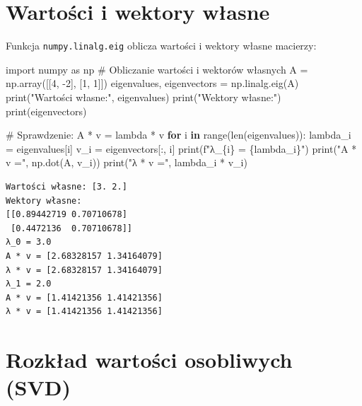 \documentclass[
  polish,
  letterpaper,
  DIV=11,
  numbers=noendperiod]{scrreprt}
\newenvironment{Shaded}{\begin{snugshade}}{\end{snugshade}}
\newcommand{\BuiltInTok}[1]{\textcolor[rgb]{0.00,0.23,0.31}{#1}}
\newcommand{\CommentTok}[1]{\textcolor[rgb]{0.37,0.37,0.37}{#1}}
\newcommand{\ControlFlowTok}[1]{\textcolor[rgb]{0.00,0.23,0.31}{\textbf{#1}}}
\newcommand{\DecValTok}[1]{\textcolor[rgb]{0.68,0.00,0.00}{#1}}
\newcommand{\ImportTok}[1]{\textcolor[rgb]{0.00,0.46,0.62}{#1}}
\newcommand{\KeywordTok}[1]{\textcolor[rgb]{0.00,0.23,0.31}{\textbf{#1}}}
\newcommand{\NormalTok}[1]{\textcolor[rgb]{0.00,0.23,0.31}{#1}}
\newcommand{\OperatorTok}[1]{\textcolor[rgb]{0.37,0.37,0.37}{#1}}
\newcommand{\SpecialCharTok}[1]{\textcolor[rgb]{0.37,0.37,0.37}{#1}}
\newcommand{\SpecialStringTok}[1]{\textcolor[rgb]{0.13,0.47,0.30}{#1}}
\newcommand{\StringTok}[1]{\textcolor[rgb]{0.13,0.47,0.30}{#1}}
\begin{document}
\section{Wartości i wektory
własne}\label{wartoux15bci-i-wektory-wux142asne}

Funkcja \texttt{numpy.linalg.eig} oblicza wartości i wektory własne
macierzy:

\begin{Shaded}
\begin{Highlighting}[]
\ImportTok{import}\NormalTok{ numpy }\ImportTok{as}\NormalTok{ np}
\CommentTok{\# Obliczanie wartości i wektorów własnych}
\NormalTok{A }\OperatorTok{=}\NormalTok{ np.array([[}\DecValTok{4}\NormalTok{, }\OperatorTok{{-}}\DecValTok{2}\NormalTok{], [}\DecValTok{1}\NormalTok{, }\DecValTok{1}\NormalTok{]])}
\NormalTok{eigenvalues, eigenvectors }\OperatorTok{=}\NormalTok{ np.linalg.eig(A)}
\BuiltInTok{print}\NormalTok{(}\StringTok{"Wartości własne:"}\NormalTok{, eigenvalues)}
\BuiltInTok{print}\NormalTok{(}\StringTok{"Wektory własne:"}\NormalTok{)}
\BuiltInTok{print}\NormalTok{(eigenvectors)}

\CommentTok{\# Sprawdzenie: A * v = lambda * v}
\ControlFlowTok{for}\NormalTok{ i }\KeywordTok{in} \BuiltInTok{range}\NormalTok{(}\BuiltInTok{len}\NormalTok{(eigenvalues)):}
\NormalTok{    lambda\_i }\OperatorTok{=}\NormalTok{ eigenvalues[i]}
\NormalTok{    v\_i }\OperatorTok{=}\NormalTok{ eigenvectors[:, i]}
    \BuiltInTok{print}\NormalTok{(}\SpecialStringTok{f"λ\_}\SpecialCharTok{\{}\NormalTok{i}\SpecialCharTok{\}}\SpecialStringTok{ = }\SpecialCharTok{\{}\NormalTok{lambda\_i}\SpecialCharTok{\}}\SpecialStringTok{"}\NormalTok{)}
    \BuiltInTok{print}\NormalTok{(}\StringTok{"A * v ="}\NormalTok{, np.dot(A, v\_i))}
    \BuiltInTok{print}\NormalTok{(}\StringTok{"λ * v ="}\NormalTok{, lambda\_i }\OperatorTok{*}\NormalTok{ v\_i)}
\end{Highlighting}
\end{Shaded}

\begin{verbatim}
Wartości własne: [3. 2.]
Wektory własne:
[[0.89442719 0.70710678]
 [0.4472136  0.70710678]]
λ_0 = 3.0
A * v = [2.68328157 1.34164079]
λ * v = [2.68328157 1.34164079]
λ_1 = 2.0
A * v = [1.41421356 1.41421356]
λ * v = [1.41421356 1.41421356]
\end{verbatim}

\section{Rozkład wartości osobliwych
(SVD)}\label{rozkux142ad-wartoux15bci-osobliwych-svd}
\end{document}
